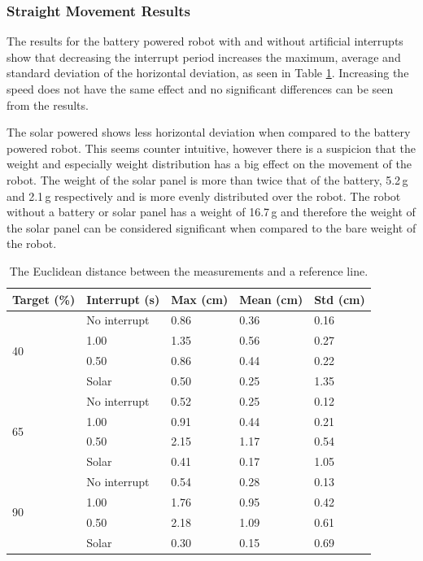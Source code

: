 \subsubsection{Straight Movement Results}

The results for the battery powered robot with and without artificial interrupts show that decreasing the interrupt period increases the maximum, average and standard deviation of the horizontal deviation, as seen in Table \ref{tab:straight_results}.
Increasing the speed does not have the same effect and no significant differences can be seen from the results.

The solar powered shows less horizontal deviation when compared to the battery powered robot.
This seems counter intuitive, however there is a suspicion that the weight and especially weight distribution has a big effect on the movement of the robot.
The weight of the solar panel is more than twice that of the battery, 5.2\,g and 2.1\,g respectively and is more evenly distributed over the robot.
The robot without a battery or solar panel has a weight of 16.7\,g and therefore the weight of the solar panel can be considered significant when compared to the bare weight of the robot.

\begin{table}[t]
	\centering
	\caption{The Euclidean distance between the measurements and a reference line.}
	\label{tab:straight_results}
	\begin{tabular}{|l|l||l|l|l|}
		\hline
		Target (\%) & Interrupt (s) & Max (cm) & Mean (cm) & Std (cm)\\
		\hline \hline
		\multirow{4}{*}{40} & No interrupt & 0.86 & 0.36 & 0.16 \\
		& 1.00 & 1.35 & 0.56 & 0.27 \\
		& 0.50 & 0.86 & 0.44 & 0.22 \\
		& Solar & 0.50 & 0.25 & 1.35 \\
		\hline
		\multirow{4}{*}{65} & No interrupt & 0.52 & 0.25 & 0.12 \\
		& 1.00 & 0.91 & 0.44 & 0.21 \\
		& 0.50 & 2.15 & 1.17 & 0.54 \\
		& Solar & 0.41 & 0.17 & 1.05 \\
		\hline
		\multirow{4}{*}{90} & No interrupt & 0.54 & 0.28 & 0.13 \\
		& 1.00 & 1.76 & 0.95 & 0.42 \\
		& 0.50 & 2.18 & 1.09 & 0.61 \\
		& Solar & 0.30 & 0.15 & 0.69 \\
		\hline
	\end{tabular}
\end{table}

